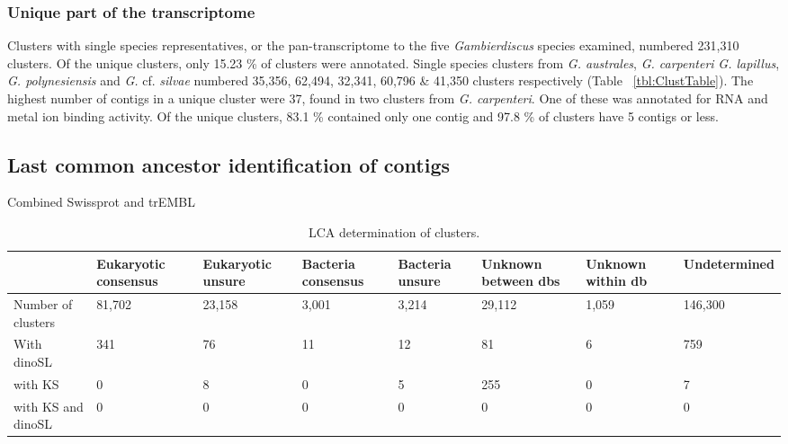 \documentclass[12pt]{article}
\begin{document}
\subsubsection{Unique part of the transcriptome}
Clusters with single species representatives, or the pan-transcriptome to the five \textit{Gambierdiscus} species examined, numbered 231,310 clusters. 
Of the unique clusters, only 15.23 \% of clusters were annotated. 
Single species clusters from \emph{G. australes}, \textit{G. carpenteri} \textit{G. lapillus}, \textit{G. polynesiensis} and \textit{G.} cf. \textit{silvae} numbered 35,356, 62,494, 32,341, 60,796 \& 41,350 clusters respectively (Table ~\ref{tbl:ClustTable}). 
The highest number of contigs in a unique cluster were 37, found in two clusters from \textit{G. carpenteri}. 
One of these was annotated for RNA and metal ion binding activity. 
Of the unique clusters, 83.1 \% contained only one contig and 97.8 \% of clusters have 5 contigs or less. 

\subsection{Last common ancestor identification of contigs}
Combined Swissprot and trEMBL
\begin{table} %
\caption{LCA determination of clusters.}
\label{tbl:LCAClust}
\begin{tabular}{ | p{1.5cm} | p{1.5cm} | p{1.5cm} | p{1.5cm} |p{1.5cm} |p{1.5cm} |p{1.5cm} |p{1.5cm} |}
\hline
&Eukaryotic consensus&Eukaryotic unsure&Bacteria consensus&Bacteria unsure&Unknown between dbs&Unknown within db&Undetermined\\
\hline
Number of clusters&81,702&23,158&3,001&3,214&29,112&1,059&146,300\\
\hline
With dinoSL&341&76&11&12&81&6&759\\
\hline
with KS&0&8&0&5&255&0&7\\
\hline
with KS and dinoSL&0&0&0&0&0&0&0\\
\hline
\end{tabular}
\end{table}
\end{document}
